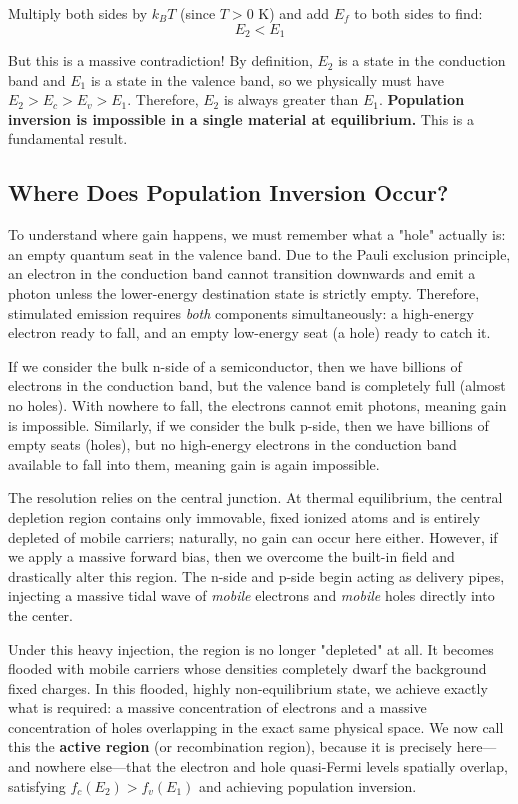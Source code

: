 Multiply both sides by $k_B T$ (since $T > 0$ K) and add $E_f$ to both sides to find:
\begin{equation*}
    E_2 < E_1
\end{equation*}

But this is a massive contradiction! By definition, $E_2$ is a state in the conduction band and $E_1$ is a state in the valence band, so we physically must have $E_2 > E_c > E_v > E_1$. Therefore, $E_2$ is always greater than $E_1$. \textbf{Population inversion is impossible in a single material at equilibrium.} This is a fundamental result.

\subsection{Where Does Population Inversion Occur?}

To understand where gain happens, we must remember what a "hole" actually is: an empty quantum seat in the valence band. Due to the Pauli exclusion principle, an electron in the conduction band cannot transition downwards and emit a photon unless the lower-energy destination state is strictly empty. Therefore, stimulated emission requires \emph{both} components simultaneously: a high-energy electron ready to fall, and an empty low-energy seat (a hole) ready to catch it.

If we consider the bulk n-side of a semiconductor, then we have billions of electrons in the conduction band, but the valence band is completely full (almost no holes). With nowhere to fall, the electrons cannot emit photons, meaning gain is impossible. Similarly, if we consider the bulk p-side, then we have billions of empty seats (holes), but no high-energy electrons in the conduction band available to fall into them, meaning gain is again impossible.

The resolution relies on the central junction. At thermal equilibrium, the central depletion region contains only immovable, fixed ionized atoms and is entirely depleted of mobile carriers; naturally, no gain can occur here either. However, if we apply a massive forward bias, then we overcome the built-in field and drastically alter this region. The n-side and p-side begin acting as delivery pipes, injecting a massive tidal wave of \emph{mobile} electrons and \emph{mobile} holes directly into the center.

Under this heavy injection, the region is no longer "depleted" at all. It becomes flooded with mobile carriers whose densities completely dwarf the background fixed charges. In this flooded, highly non-equilibrium state, we achieve exactly what is required: a massive concentration of electrons and a massive concentration of holes overlapping in the exact same physical space. We now call this the \textbf{active region} (or recombination region), because it is precisely here—and nowhere else—that the electron and hole quasi-Fermi levels spatially overlap, satisfying $f_c(E_2) > f_v(E_1)$ and achieving population inversion.

